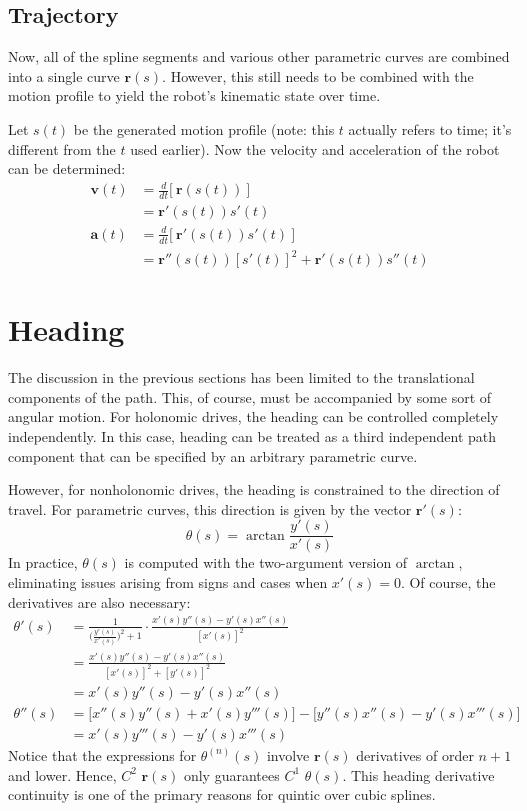 \documentclass{article}
\begin{document}
\subsection{Trajectory}
Now, all of the spline segments and various other parametric curves are combined into a single curve $\mathbf{r}(s)$. However, this still needs to be combined with the motion profile to yield the robot's kinematic state over time.

Let $s(t)$ be the generated motion profile (note: this $t$ actually refers to time; it's different from the $t$ used earlier). Now the velocity and acceleration of the robot can be determined:
\begin{equation*}
\begin{split}
    \mathbf{v}(t) &= \frac{d}{dt} \Big[\ \mathbf{r}(s(t))\ \Big] \\
                  &= \mathbf{r}'(s(t)) s'(t) \\
    \mathbf{a}(t) &= \frac{d}{dt} \Big[\ \mathbf{r}'(s(t)) s'(t)\ \Big] \\
                  &= \mathbf{r}''(s(t)) [s'(t)]^2 + \mathbf{r}'(s(t)) s''(t)
\end{split}
\end{equation*}

\section{Heading}
The discussion in the previous sections has been limited to the translational components of the path. This, of course, must be accompanied by some sort of angular motion. For holonomic drives, the heading can be controlled completely independently. In this case, heading can be treated as a third independent path component that can be specified by an arbitrary parametric curve.

However, for nonholonomic drives, the heading is constrained to the direction of travel. For parametric curves, this direction is given by the vector $\mathbf{r}'(s)$:
$$
    \theta(s) = \arctan \frac{y'(s)}{x'(s)}
$$
In practice, $\theta(s)$ is computed with the two-argument version of $\arctan$, eliminating issues arising from signs and cases when $x'(s) = 0$. Of course, the derivatives are also necessary:
\begin{equation*}
\begin{split}
    \theta'(s) &= \frac{1}{\big(\frac{y'(s)}{x'(s)}\big)^2+1} \cdot \frac{x'(s)y''(s) - y'(s)x''(s)}{[x'(s)]^2} \\
               &= \frac{x'(s)y''(s) - y'(s)x''(s)}{[x'(s)]^2 + [y'(s)]^2} \\
               &= x'(s)y''(s) - y'(s)x''(s) \\
    \theta''(s) &= \big[x''(s)y''(s) + x'(s)y'''(s)\big] - \big[y''(s)x''(s) - y'(s)x'''(s)\big] \\
                &= x'(s)y'''(s) - y'(s)x'''(s)
\end{split}
\end{equation*}
Notice that the expressions for $\theta^{(n)}(s)$ involve $\mathbf{r}(s)$ derivatives of order $n + 1$ and lower. Hence, $C^2$ $\mathbf{r}(s)$ only guarantees $C^1$ $\theta(s)$. This heading derivative continuity is one of the primary reasons for quintic over cubic splines.
\end{document}
